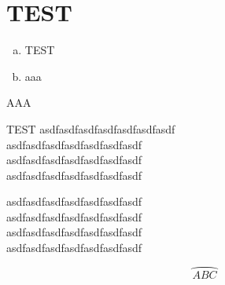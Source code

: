\documentclass[12pt, a4paper]{article}
\title{} %
\author{} %
\date{} %
\newcommand{\Arc}[1]{\wideparen{{#1}}}
\theoremstyle{mystyle}	%
\begin{document}
\section{TEST}
\begin{enumerate}[a.]
  \item TEST
  \item aaa
\end{enumerate}
\begin{prolist}{AAA}
  \item TEST
    asdfasdfasdfasdfasdfasdfasdf\\
    asdfasdfasdfasdfasdfasdfasdf\\
    asdfasdfasdfasdfasdfasdfasdf\\
    asdfasdfasdfasdfasdfasdfasdf
  \item
    asdfasdfasdfasdfasdfasdfasdf\\
    asdfasdfasdfasdfasdfasdfasdf\\
    asdfasdfasdfasdfasdfasdfasdf\\
    asdfasdfasdfasdfasdfasdfasdf
\end{prolist}
\[
  \Arc{ABC}
\]
\end{document}
